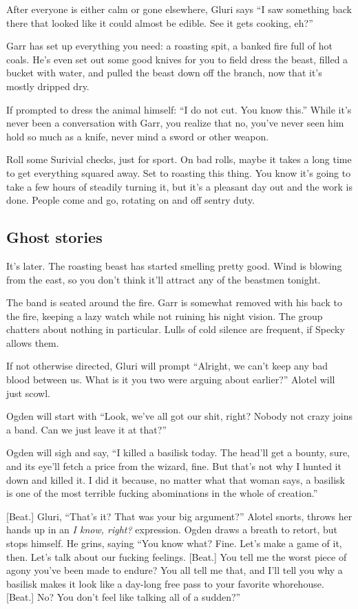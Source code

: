 \begin{multicols}{2}
After everyone is either calm or gone elsewhere, Gluri says
``I saw something back there that looked like it could almost be edible.
See it gets cooking, eh?''

Garr has set up everything you need: a roasting spit, a banked fire full of hot coals.
He's even set out some good knives for you to field dress the beast,
filled a bucket with water, and pulled the beast down off the branch, now that it's mostly
dripped dry.

If prompted to dress the animal himself: ``I do not cut.  You know this.''
While it's never been a conversation with Garr, you realize that no, you've never seen him hold
so much as a knife, never mind a sword or other weapon.

Roll some Surivial checks, just for sport.
On bad rolls, maybe it takes a long time to get everything squared away.
Set to roasting this thing.
You know it's going to take a few hours of steadily turning it, but it's a pleasant day out
and the work is done.
People come and go, rotating on and off sentry duty.

\subsection{Ghost stories}

It's later.
The roasting beast has started smelling pretty good.
Wind is blowing from the east, so you don't think it'll attract any of the beastmen tonight.

The band is seated around the fire.
Garr is somewhat removed with his back to the fire, keeping a lazy watch while not ruining his
night vision.
The group chatters about nothing in particular.
Lulls of cold silence are frequent, if Specky allows them.

If not otherwise directed, Gluri will prompt
``Alright, we can't keep any bad blood between us.
What is it you two were arguing about earlier?''
Alotel will just scowl.

Ogden will start with
``Look, we've all got our shit, right?
Nobody not crazy joins a band.
Can we just leave it at that?''

Ogden will sigh and say,
``I killed a basilisk today.
The head'll get a bounty, sure, and its eye'll fetch a price from the wizard, fine.
But that's not why I hunted it down and killed it.
I did it because, no matter what that woman says, a basilisk is one of the most terrible
fucking abominations in the whole of creation.''

[Beat.]  Gluri, ``That's it?  That was your big argument?''
Alotel snorts, throws her hands up in an \emph{I know, right?} expression.
Ogden draws a breath to retort, but stops himself.
He grins, saying
``You know what?
Fine.
Let's make a game of it, then.
Let's talk about our fucking feelings.
[Beat.]
You tell me the worst piece of agony you've been made to endure?
You all tell me that, and I'll tell you why a basilisk makes it look like a day-long free pass
to your favorite whorehouse.
[Beat.]
No?
You don't feel like talking all of a sudden?''



\end{multicols}
